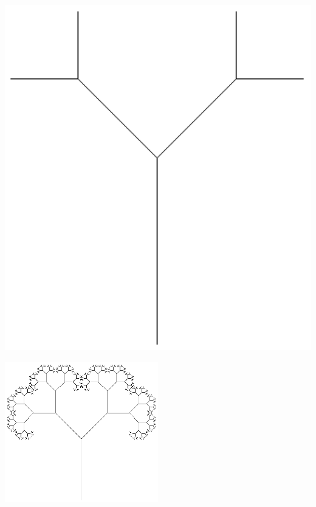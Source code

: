 \begin{minipage}[b]{0.3\textwidth}
  \centering
  \includegraphics[width=1.0\textwidth]{./inf/SEKII/06_Java_Rekursion/Aufgabe2_1-3.png}
\end{minipage}

\vspace{5mm}

\begin{minipage}[b]{1.0\textwidth}
  \centering
  \includegraphics[width=0.5\textwidth]{./inf/SEKII/06_Java_Rekursion/Aufgabe2_1-10.png}
\end{minipage}


